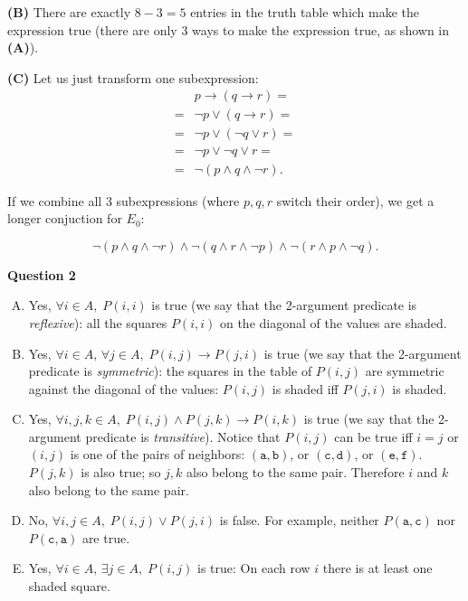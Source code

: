 \documentclass[jou]{apa6}
\begin{document}
{\bf (B)} There are exactly $8-3 = 5$ entries in the truth table which make the expression true
(there are only $3$ ways to make the expression true, as shown in {\bf (A)}). 

{\bf (C)} Let us just transform one subexpression: 
\begin{align}
 & p \rightarrow (q \rightarrow r) = \nonumber \\
= & \neg p \vee (q \rightarrow r) = \nonumber \\
= & \neg p \vee (\neg q \vee r) = \nonumber \\
= & \neg p \vee \neg q \vee r  = \nonumber \\
= & \neg (p \wedge q \wedge \neg r). \nonumber
\end{align}

If we combine all $3$ subexpressions (where $p,q,r$ switch their order), we get 
a longer conjuction for $E_0$:

$$\neg (p \wedge q \wedge \neg r) \wedge \neg (q \wedge r \wedge \neg p) \wedge \neg (r \wedge p \wedge \neg q).$$


\vspace{10pt}
{\bf Question 2}
\begin{enumerate}[(A)]
\item Yes, $\forall i \in A,\;P(i,i)$ is true (we say that the 2-argument predicate 
is {\em reflexive}): all the squares $P(i,i)$ on the diagonal of the values are shaded. 
\item Yes, $\forall i \in A,\,\forall j \in A,\;P(i,j) \rightarrow P(j,i)$ is true (we say that the 2-argument predicate 
is {\em symmetric}): the squares in the table of $P(i,j)$ are symmetric against
the diagonal of the values: $P(i,j)$ is shaded iff $P(j,i)$ is shaded.
\item Yes, $\forall i,j,k \in A,\;P(i,j) \wedge P(j,k) \rightarrow P(i,k)$ is true 
(we say that the 2-argument predicate 
is {\em transitive}). Notice that $P(i,j)$ can be true iff $i=j$ or $(i,j)$ is 
one of the pairs of neighbors: $(\mathtt{a},\mathtt{b})$, or $(\mathtt{c},\mathtt{d})$, or $(\mathtt{e},\mathtt{f})$.
$P(j,k)$ is also true; so $j,k$ also belong to the same pair. Therefore $i$ and $k$ also belong to the same pair. 
\item No, $\forall i,j \in A,\;P(i,j) \vee P(j,i)$ is false. For example, neither $P(\mathtt{a},\mathtt{c})$
nor $P(\mathtt{c},\mathtt{a})$ are true.
\item Yes, $\forall i \in A,\, \exists j \in A,\;P(i,j)$ is true: On each row $i$ there is at least
one shaded square.
\end{enumerate}
\end{document}
